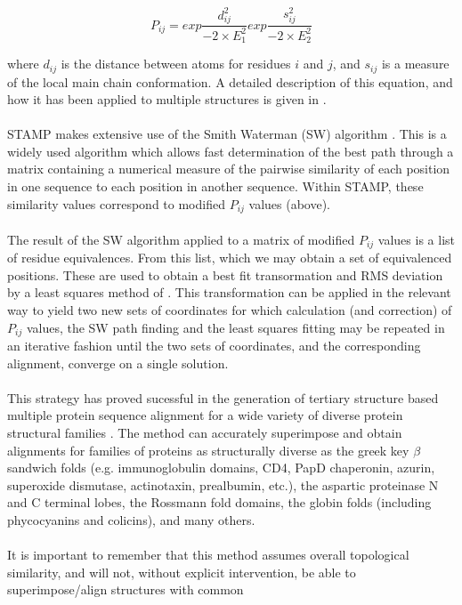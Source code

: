 \[
P_{ij} = exp \frac{d_{ij}^{2}}{-2 \times E_{1}^{2}} 
         exp \frac{s_{ij}^{2}}{-2 \times E_{2}^{2}} 
\]

where $d_{ij}$ is the distance between \Cal atoms for residues $i$
and $j$, and $s_{ij}$ is a measure of the local main chain conformation.
A detailed description of this equation, and how it has been
applied to multiple structures is given in \cite{rb92b}. \\
\\
STAMP makes extensive use of the Smith Waterman (SW) algorithm 
\cite{smith81,barton93b,timewarps}.  This is a widely used algorithm 
which allows fast determination of the best path through a matrix 
containing a numerical measure of the pairwise similarity of each 
position in one sequence to each position in another sequence.  Within 
STAMP, these similarity values correspond to modified $P_{ij}$ 
values (above).\\
\\
The result of the SW algorithm applied to a matrix of modified $P_{ij}$
values is a list of residue equivalences.  From this list, which
we may obtain a set of equivalenced \Cal positions.  These are
used to obtain a best fit transormation and RMS deviation by a
least squares method of \cite{kabsch78,mclachlan79}.  This
transformation can be applied in the relevant way to yield two
new sets of coordinates for which calculation (and correction) of
$P_{ij}$ values, the SW path finding and the least squares fitting may
be repeated in an iterative fashion until the two sets of
coordinates, and the corresponding alignment, converge on a
single solution.\\
\\
This strategy has proved sucessful in the generation of tertiary
structure based multiple protein sequence alignment for a wide
variety of diverse protein structural families 
\cite{rb92b,rb93b,rb93c,rb94,russell94}.  
The method can accurately superimpose and obtain alignments for families 
of proteins as structurally diverse as the greek key $\beta$ sandwich 
folds (e.g. immunoglobulin domains, CD4, PapD chaperonin, 
azurin, superoxide dismutase, actinotaxin, prealbumin, etc.), the
aspartic proteinase N and C terminal lobes, the Rossmann
fold domains, the globin folds (including phycocyanins and
colicins), and many others.\\
\\
It is important to remember that this method assumes overall
topological similarity, and will not, without explicit
intervention,  be able to superimpose/align structures with common
